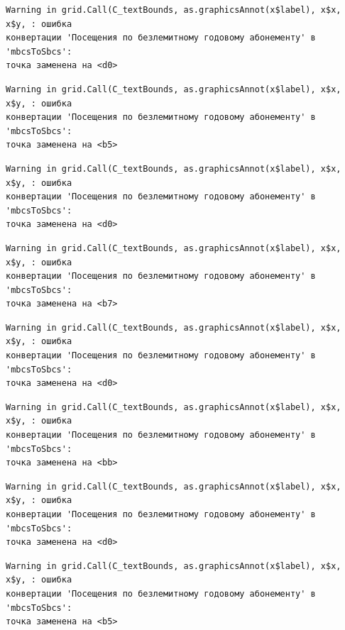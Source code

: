 \documentclass[
  letterpaper,
  DIV=11,
  numbers=noendperiod]{scrreprt}
\begin{document}
\begin{verbatim}
Warning in grid.Call(C_textBounds, as.graphicsAnnot(x$label), x$x, x$y, : ошибка
конвертации 'Посещения по безлемитному годовому абонементу' в 'mbcsToSbcs':
точка заменена на <d0>
\end{verbatim}

\begin{verbatim}
Warning in grid.Call(C_textBounds, as.graphicsAnnot(x$label), x$x, x$y, : ошибка
конвертации 'Посещения по безлемитному годовому абонементу' в 'mbcsToSbcs':
точка заменена на <b5>
\end{verbatim}

\begin{verbatim}
Warning in grid.Call(C_textBounds, as.graphicsAnnot(x$label), x$x, x$y, : ошибка
конвертации 'Посещения по безлемитному годовому абонементу' в 'mbcsToSbcs':
точка заменена на <d0>
\end{verbatim}

\begin{verbatim}
Warning in grid.Call(C_textBounds, as.graphicsAnnot(x$label), x$x, x$y, : ошибка
конвертации 'Посещения по безлемитному годовому абонементу' в 'mbcsToSbcs':
точка заменена на <b7>
\end{verbatim}

\begin{verbatim}
Warning in grid.Call(C_textBounds, as.graphicsAnnot(x$label), x$x, x$y, : ошибка
конвертации 'Посещения по безлемитному годовому абонементу' в 'mbcsToSbcs':
точка заменена на <d0>
\end{verbatim}

\begin{verbatim}
Warning in grid.Call(C_textBounds, as.graphicsAnnot(x$label), x$x, x$y, : ошибка
конвертации 'Посещения по безлемитному годовому абонементу' в 'mbcsToSbcs':
точка заменена на <bb>
\end{verbatim}

\begin{verbatim}
Warning in grid.Call(C_textBounds, as.graphicsAnnot(x$label), x$x, x$y, : ошибка
конвертации 'Посещения по безлемитному годовому абонементу' в 'mbcsToSbcs':
точка заменена на <d0>
\end{verbatim}

\begin{verbatim}
Warning in grid.Call(C_textBounds, as.graphicsAnnot(x$label), x$x, x$y, : ошибка
конвертации 'Посещения по безлемитному годовому абонементу' в 'mbcsToSbcs':
точка заменена на <b5>
\end{verbatim}
\end{document}
